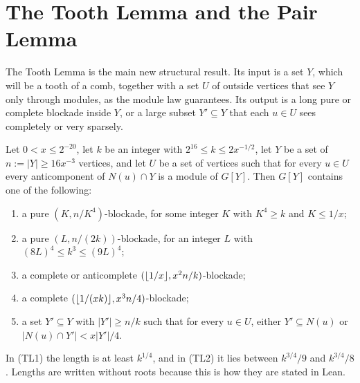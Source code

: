 \section{The Tooth Lemma and the Pair Lemma}\label{sec:tooth}

The Tooth Lemma is the main new structural result. Its input is a set $Y$, which will be a tooth of a
comb, together with a set $U$ of outside vertices that see $Y$ only through modules, as the module law
guarantees. Its output is a long pure or complete blockade inside $Y$, or a large subset $Y'\subseteq Y$
that each $u\in U$ sees completely or very sparsely.

\begin{lemma}\label{lem:tooth}
Let $0<x\le2^{-20}$, let $k$ be an integer with $2^{16}\le k\le2x^{-1/2}$, let $Y$ be a set of $n:=|Y|\ge
16x^{-3}$ vertices, and let $U$ be a set of vertices such that for every $u\in U$ every anticomponent of
$N(u)\cap Y$ is a module of $G[Y]$. Then $G[Y]$ contains one of the following:
\begin{enumerate}[label=(TL\arabic*),leftmargin=3.2em]
\item a pure $(K,n/K^4)$-blockade, for some integer $K$ with $K^4\ge k$ and $K\le1/x$;
\item a pure $(L,n/(2k))$-blockade, for an integer $L$ with $(8L)^4\le k^3\le(9L)^4$;
\item a complete or anticomplete $(\lfloor 1/x\rfloor,x^2n/k)$-blockade;
\item a complete $(\lfloor 1/(xk)\rfloor,x^3n/4)$-blockade;
\item a set $Y'\subseteq Y$ with $|Y'|\ge n/k$ such that for every $u\in U$, either $Y'\subseteq N(u)$ or
  $|N(u)\cap Y'|<x|Y'|/4$.
\end{enumerate}
\end{lemma}

In (TL1) the length is at least $k^{1/4}$, and in (TL2) it lies between $k^{3/4}/9$ and $k^{3/4}/8$.
Lengths are written without roots because this is how they are stated in Lean.

